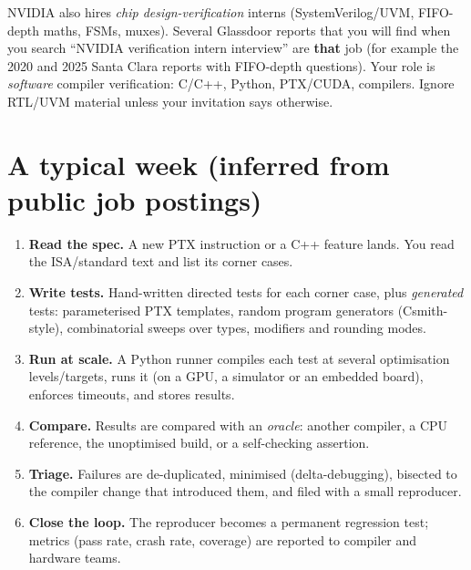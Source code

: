 \documentclass[10pt,a4paper,openany,oneside]{report}
\newcommand{\prio}[1]{\texorpdfstring{\ifcase#1\or{\color{gold}\ding{72}}\or{\color{gold}\ding{72}\ding{72}}\or{\color{gold}\ding{72}\ding{72}\ding{72}}\fi}{}}
\begin{document}
\begin{trapbox}
NVIDIA also hires \emph{chip design-verification} interns (SystemVerilog/UVM, FIFO-depth maths, FSMs, muxes). Several Glassdoor reports that you
will find when you search ``NVIDIA verification intern interview'' are \textbf{that} job (for example the 2020 and 2025 Santa Clara reports with
FIFO-depth questions). Your role is \emph{software} compiler verification: C/C++, Python, PTX/CUDA, compilers. Ignore RTL/UVM material unless your
invitation says otherwise.
\end{trapbox}

\section{A typical week (inferred from public job postings) \prio{2}}
\begin{enumerate}
\item \textbf{Read the spec.} A new PTX instruction or a C++ feature lands. You read the ISA/standard text and list its corner cases.
\item \textbf{Write tests.} Hand-written directed tests for each corner case, plus \emph{generated} tests: parameterised PTX templates, random program
 generators (Csmith-style), combinatorial sweeps over types, modifiers and rounding modes.
\item \textbf{Run at scale.} A Python runner compiles each test at several optimisation levels/targets, runs it (on a GPU, a simulator or an
 embedded board), enforces timeouts, and stores results.
\item \textbf{Compare.} Results are compared with an \emph{oracle}: another compiler, a CPU reference, the unoptimised build, or a self-checking assertion.
\item \textbf{Triage.} Failures are de-duplicated, minimised (delta-debugging), bisected to the compiler change that introduced them, and filed with a
 small reproducer.
\item \textbf{Close the loop.} The reproducer becomes a permanent regression test; metrics (pass rate, crash rate, coverage) are reported to compiler and
 hardware teams.
\end{enumerate}
\end{document}
